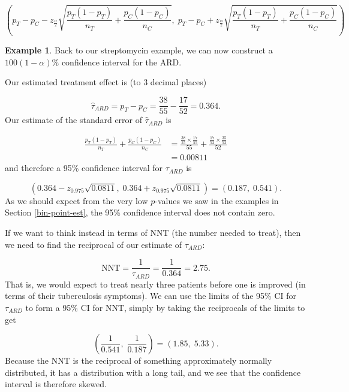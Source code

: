 \documentclass[
  openany]{book}
\theoremstyle{definition}
\theoremstyle{definition}
\newtheorem{example}{Example}[chapter]
\theoremstyle{definition}
\theoremstyle{definition}
\theoremstyle{remark}
\begin{document}
\[\left(p_T - p_C - z_{\frac{\alpha}{2}}\sqrt{\frac{p_T\left(1-p_T\right)}{n_T} + \frac{p_C\left(1-p_C\right)}{n_C}},\; p_T - p_C + z_{\frac{\alpha}{2}}\sqrt{\frac{p_T\left(1-p_T\right)}{n_T} + \frac{p_C\left(1-p_C\right)}{n_C}}\right) \]

\begin{example}
Back to our streptomycin example, we can now construct a \(100\left(1-\alpha\right)\)\% confidence interval for the ARD.

Our estimated treatment effect is (to 3 decimal places)

\[\hat\tau_{ARD}=p_T - p_C = \frac{38}{55} - \frac{17}{52} = 0.364.\]
Our estimate of the standard error of \(\hat\tau_{ARD}\) is

\[
\begin{aligned}
\frac{p_T\left(1-p_T\right)}{n_T} + \frac{p_C\left(1-p_C\right)}{n_C} & = \frac{\frac{38}{55}\times \frac{17}{55}}{55} + \frac{\frac{17}{52}\times \frac{35}{52}}{52}\\
& = 0.00811
\end{aligned}
\]
and therefore a 95\% confidence interval for \(\tau_{ARD}\) is

\[\left(0.364 - z_{0.975}\sqrt{0.0811},\; 0.364 + z_{0.975}\sqrt{0.0811}\right) = \left(0.187,\; 0.541\right). \]
As we should expect from the very low \(p\)-values we saw in the examples in Section \ref{bin-point-est}, the 95\% confidence interval does not contain zero.

If we want to think instead in terms of NNT (the number needed to treat), then we need to find the reciprocal of our estimate of \(\tau_{ARD}\):

\[ \text{NNT} = \frac{1}{\tau_{ARD}} = \frac{1}{0.364} = 2.75.\]
That is, we would expect to treat nearly three patients before one is improved (in terms of their tuberculosis symptoms). We can use the limits of the 95\% CI for \(\tau_{ARD}\) to form a 95\% CI for NNT, simply by taking the reciprocals of the limits to get

\[\left(\frac{1}{0.541},\; \frac{1}{0.187}\right) = \left(1.85,\; 5.33 \right).\]
Because the NNT is the reciprocal of something approximately normally distributed, it has a distribution with a long tail, and we see that the confidence interval is therefore skewed.


\end{example}
\end{document}
